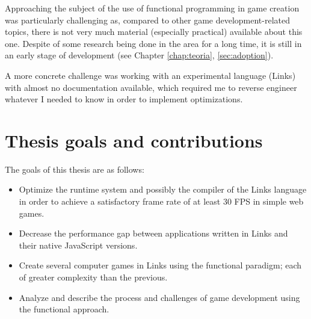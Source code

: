 Approaching the subject of the use of functional programming in game creation was particularly challenging as, compared to other game development-related topics, there is not very much material (especially practical) available about this one. Despite of some research being done in the area for a long time, it is still in an early stage of development (see Chapter \ref{chap:teoria}, \ref{sec:adoption}). 

A more concrete challenge was working with an experimental language (Links) with almost no documentation available, which required me to reverse engineer whatever I needed to know in order to implement optimizations.


\section{Thesis goals and contributions}\label{sec:cele_pracy}
The goals of this thesis are as follows:
\begin{itemize}
    \item Optimize the runtime system and possibly the compiler  of the Links language in order to achieve a satisfactory frame rate of at least 30 FPS in simple web games.
    \item Decrease the performance gap between applications written in Links and their native JavaScript versions.
    \item Create several computer games in Links using the functional paradigm; each of greater complexity than the previous.
    \item Analyze and describe the process and challenges of game development using the functional approach. %
\end{itemize}

